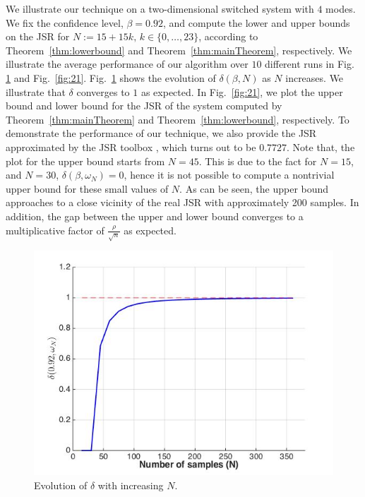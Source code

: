 We illustrate our technique on a two-dimensional switched system with $4$ modes. We fix the confidence level, \mbox{$\beta = 0.92$}, and compute the lower and upper bounds on the JSR for $N:=15+15k,\, k \in\{0, \ldots, 23\}$, according to Theorem~\ref{thm:lowerbound} and Theorem~\ref{thm:mainTheorem}, respectively. We illustrate the average performance of our algorithm over $10$ different runs in Fig.~ \ref{fig:11} and Fig.~\ref{fig:21}. Fig.~\ref{fig:11} shows the evolution of $\delta(\beta, N)$ as $N$ increases. We illustrate that $\delta$ converges to $1$ as expected. In Fig.~\ref{fig:21}, we plot the upper bound and lower bound for the JSR of the system computed by Theorem~\ref{thm:mainTheorem} and Theorem~\ref{thm:lowerbound}, respectively. To demonstrate the performance of our technique, we also provide the JSR approximated by the JSR toolbox \cite{jsrtoolbox}, which turns out to be $0.7727$. Note that, the plot for the upper bound starts from $N=45$. This is due to the fact for $N=15$, and $N=30$, $\delta(\beta, \omega_N) = 0$, hence it is not possible to compute a nontrivial upper bound for these small values of $N$. As can be seen, the upper bound approaches to a close vicinity of the real JSR with approximately 200 samples. In addition, the gap between the upper and lower bound converges to a multiplicative factor of $\frac{\rho}{\sqrt{n}}$ as expected.

\begin{figure}
\begin{center}
\includegraphics[trim = 5mm 5mm 5mm 5mm, scale=0.35]{delta1.jpg}

\caption{Evolution of $\delta$ with increasing $N$.}
\label{fig:11}
\end{center}
\end{figure}

